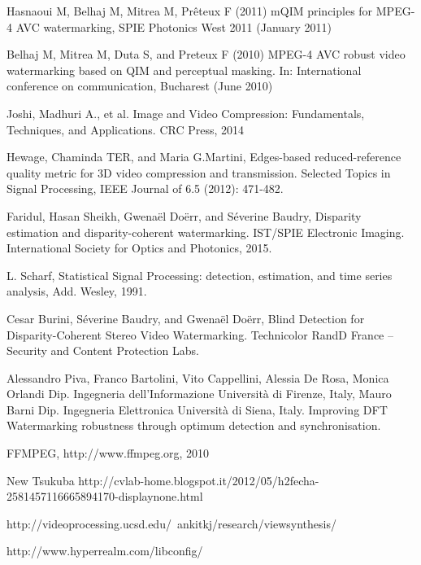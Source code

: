 \begin{thebibliography}{99}
Hasnaoui M, Belhaj M, Mitrea M, Prêteux F (2011) mQIM principles for MPEG-4 AVC watermarking, SPIE Photonics West 2011 (January 2011)

Belhaj M, Mitrea M, Duta S, and Preteux F (2010) MPEG-4 AVC robust video watermarking based on QIM and perceptual masking. In: International conference on communication, Bucharest (June 2010)

Joshi, Madhuri A., et al. Image and Video Compression: Fundamentals, Techniques, and Applications. CRC Press, 2014

 Hewage, Chaminda TER, and Maria G.Martini, Edges-based reduced-reference quality metric for 3D video compression and transmission. Selected Topics in Signal Processing, IEEE Journal of 6.5 (2012): 471-482.



Faridul, Hasan Sheikh, Gwenaël Doërr, and Séverine Baudry, Disparity estimation and disparity-coherent watermarking. IST/SPIE Electronic Imaging. International Society for Optics and Photonics, 2015.


L. Scharf, Statistical Signal Processing: detection,
estimation, and time series analysis, Add. Wesley,
1991.


Cesar Burini, Séverine Baudry, and Gwenaël Doërr, Blind Detection for Disparity-Coherent Stereo Video Watermarking. Technicolor RandD France – Security and Content Protection Labs.

Alessandro Piva, Franco Bartolini, Vito Cappellini, Alessia De Rosa, Monica Orlandi Dip. Ingegneria dell’Informazione Università di Firenze, Italy,  Mauro Barni Dip. Ingegneria Elettronica Università di Siena, Italy. Improving DFT Watermarking robustness through optimum detection and synchronisation.

 FFMPEG, http://www.ffmpeg.org, 2010

New Tsukuba http://cvlab-home.blogspot.it/2012/05/h2fecha-2581457116665894170-displaynone.html

 http://videoprocessing.ucsd.edu/~ankitkj/research/viewsynthesis/

 http://www.hyperrealm.com/libconfig/

\end{thebibliography}
\clearpage
\thispagestyle{empty}
